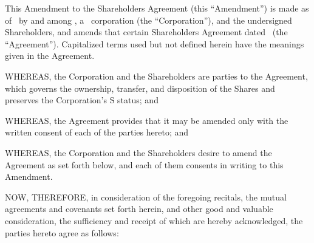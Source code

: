
\bigskip

This Amendment to the Shareholders Agreement (this ``Amendment'') is made as of
\effectiveDate\ by and among \companyName, a \companyState\ corporation (the ``Corporation''),
and the undersigned Shareholders, and amends that certain Shareholders Agreement dated
\originalAgreementDate\ (the ``Agreement''). Capitalized terms used but not defined herein
have the meanings given in the Agreement.

\bigskip
{}

\noindent WHEREAS, the Corporation and the Shareholders are parties to the Agreement, which
governs the ownership, transfer, and disposition of the Shares and preserves the Corporation's
S status; and

\smallskip
\noindent WHEREAS, the Agreement provides that it may be amended only with the written consent
of each of the parties hereto; and

\smallskip
\noindent WHEREAS, the Corporation and the Shareholders desire to amend the Agreement as set
forth below, and each of them consents in writing to this Amendment.

\smallskip
\noindent NOW, THEREFORE, in consideration of the foregoing recitals, the mutual agreements
and covenants set forth herein, and other good and valuable consideration, the sufficiency and
receipt of which are hereby acknowledged, the parties hereto agree as follows:

